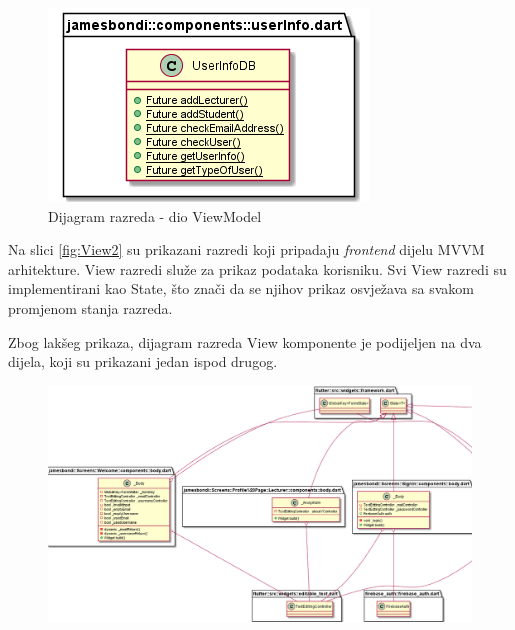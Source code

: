 			\begin{figure}[h]
				\includegraphics[scale=1]{dijagrami/ViewModel.PNG}
				\centering
				\caption{Dijagram razreda - dio ViewModel}
				\label{fig:ViewModel}
			\end{figure}
			
			Na slici \ref{fig:View2} su prikazani razredi koji pripadaju \textit{frontend} dijelu MVVM arhitekture. View razredi služe za prikaz podataka korisniku. Svi View razredi su implementirani kao State, što znači da se njihov prikaz osvježava sa svakom promjenom stanja razreda.
			
			Zbog lakšeg prikaza, dijagram razreda View komponente je podijeljen na dva dijela, koji su prikazani jedan ispod drugog.
			
			\eject
			\begin{figure}[h]
				\includegraphics[scale=0.41]{dijagrami/View1.PNG}
				\centering
			\end{figure}
			
